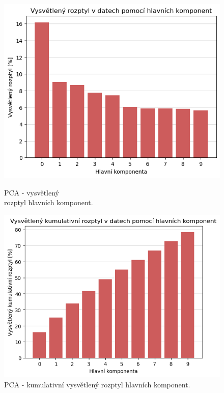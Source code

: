 \begin{figure}[hbtp!]
    \centering
    \begin{minipage}[t]{.5\textwidth}
      \centering
      \captionsetup{justification=centering}

      \includegraphics[width=\textwidth]{obrazky/pripravadat/pca-roztyl_komponetn.png}
      \caption{PCA - vysvětlený \\ rozptyl hlavních komponent.}
      \label{obr:nb:pca_roztyl_komponetn}
    \end{minipage}%
    \begin{minipage}[t]{.5\textwidth}
      \centering
      \captionsetup{justification=centering}

      \includegraphics[width=\textwidth]{obrazky/pripravadat/pca-kum_roztyl_komponetn.png}
      \caption{PCA - kumulativní vysvětlený rozptyl hlavních komponent.}
      \label{obr:nb:pca_kum_roztyl_komponetn}
    \end{minipage}
    \end{figure}

